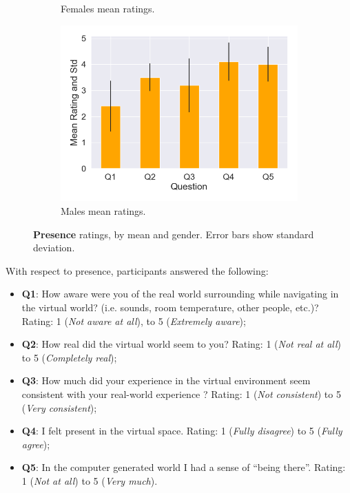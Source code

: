 \begin{figure}[H]
\begin{subfigure}[b]{0.5\textwidth}
 \caption{Females mean ratings.}
 \label{fig:presFemale}
 \end{subfigure}
  \hspace{10mm}
 \begin{subfigure}[b]{\textwidth}
 \centering
 \includegraphics[scale=0.5]{Files/Plots/presence_mean_ratings_m.png}
 \caption{Males mean ratings.}
 \label{fig:presMale}
 \end{subfigure}
 \caption{\textbf{Presence} ratings, by mean and gender. Error bars show standard deviation.}
\label{fig:presAll}
\end{figure}
With respect to presence, participants answered the following:
 \begin{itemize}
\itemsep0em
    \item \textbf{Q1}: How aware were you of the real world surrounding while navigating in the virtual world? (i.e. sounds, room temperature, other people, etc.)? Rating: 1 (\textit{Not aware at all}), to 5 (\textit{Extremely aware});
    \item \textbf{Q2}: How real did the virtual world seem to you? Rating: 1 (\textit{Not real at all}) to 5 (\textit{Completely real});
    \item \textbf{Q3}: How much did your experience in the virtual environment seem consistent with your real-world experience ?  Rating: 1 (\textit{Not consistent}) to 5 (\textit{Very consistent});
    \item \textbf{Q4}: I felt present in the virtual space. Rating: 1 (\textit{Fully disagree}) to 5 (\textit{Fully agree});
    \item \textbf{Q5}: In the computer generated world I had a sense of ``being there''.  Rating: 1 (\textit{Not at all}) to 5 (\textit{Very much}). 
\end{itemize}
